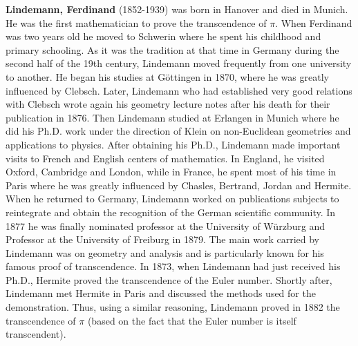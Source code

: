 \textbf{Lindemann, Ferdinand} (1852-1939) was born in Hanover and died in Munich. He was the first mathematician to prove the transcendence of $\pi$. When Ferdinand was two years old he moved to Schwerin where he spent his childhood and primary schooling. As it was the tradition at that time in Germany during the second half of the 19th century, Lindemann moved frequently from one university to another. He began his studies at Göttingen in 1870, where he was greatly influenced by Clebsch. Later, Lindemann who had established very good relations with Clebsch wrote again his geometry lecture notes after his death for their publication in 1876. Then Lindemann studied at Erlangen in Munich where he did his Ph.D. work under the direction of Klein on non-Euclidean geometries and applications to physics. After obtaining his Ph.D., Lindemann made important visits to French and English centers of mathematics. In England, he visited Oxford, Cambridge and London, while in France, he spent most of his time in Paris where he was greatly influenced by Chasles, Bertrand, Jordan and Hermite. When he returned to Germany, Lindemann worked on publications subjects to reintegrate and obtain the recognition of the German scientific community. In 1877 he was finally nominated professor at the University of Würzburg and Professor at the University of Freiburg in 1879. The main work carried by Lindemann was on geometry and analysis and is particularly known for his famous proof of transcendence. In 1873, when Lindemann had just received his Ph.D., Hermite proved the transcendence of the Euler number. Shortly after, Lindemann met Hermite in Paris and discussed the methods used for the demonstration. Thus, using a similar reasoning, Lindemann proved in 1882 the transcendence of $\pi$ (based on the fact that the Euler number is itself transcendent).

